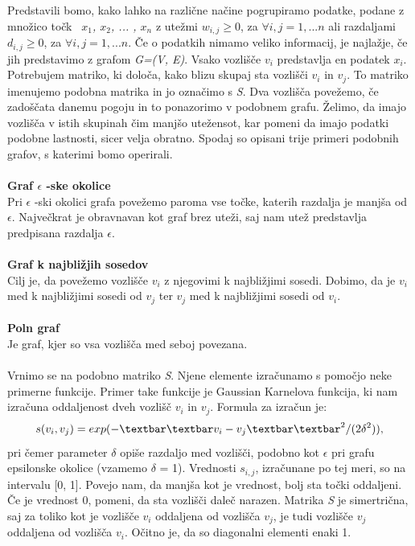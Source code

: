 \documentclass[a4paper, 10pt]{article}
\begin{document}
Predstavili bomo, kako lahko na različne načine pogrupiramo podatke, podane z množico točk \textsl{\ $x_1$, $x_2$, ... , $x_n$ } z utežmi $w_{i,j} \geq 0$, za $\forall i,j = 1, ... n$ ali razdaljami $d_{i,j} \geq 0$, za $\forall i,j = 1, ... n$. Če o podatkih nimamo veliko informacij, je najlažje, če jih predstavimo z grafom \textsl{G=(V, E)}. Vsako vozlišče $v_i$ predstavlja en podatek \textsl{$x_i$}. Potrebujem matriko, ki določa, kako blizu skupaj sta vozlišči $v_i$ in $v_j$. To matriko imenujemo podobna matrika in jo označimo s \textsl{S}. Dva vozlišča povežemo, če zadoščata danemu pogoju in to ponazorimo v podobnem grafu. Želimo, da imajo vozlišča v istih skupinah čim manjšo utežensot, kar pomeni da imajo podatki podobne lastnosti, sicer velja obratno. Spodaj so opisani trije primeri podobnih grafov, s katerimi bomo operirali.\\
\\
\textbf{Graf $\epsilon$ -ske okolice}\\
Pri $\epsilon$ -ski okolici grafa povežemo paroma vse točke, katerih razdalja je manjša od $\epsilon$. Največkrat je obravnavan kot graf brez uteži, saj nam utež predstavlja predpisana razdalja $\epsilon$.\\
\\
\textbf{Graf k najbližjih sosedov}\\
Cilj je, da povežemo vozlišče $v_i$ z njegovimi k najbližjimi sosedi. Dobimo, da je $v_i$ med k najbližjimi sosedi od $v_j$ ter $v_j$ med k najbližjimi sosedi od $v_i$.\\
\\
\textbf{Poln graf}\\
Je graf, kjer so vsa vozlišča med seboj povezana.\\
\\
Vrnimo se na podobno matriko \textsl{S}. Njene elemente izračunamo s pomočjo neke primerne funkcije. Primer take funkcije je Gaussian Karnelova funkcija, ki nam izračuna oddaljenost dveh vozlišč $v_i$ in $v_j$. Formula za izračun je:$$s(v_i, v_j) = exp(-\textbar\textbar v_i - v_j \textbar\textbar^2 / (2\delta^2)),$$pri čemer parameter $\delta$ opiše razdaljo med vozlišči, podobno kot $\epsilon$ pri grafu epsilonske okolice (vzamemo $\delta$ = 1).  Vrednosti $s_{i,j}$, izračunane po tej meri, so na intervalu [0, 1]. Povejo nam, da manjša kot je vrednost, bolj sta točki oddaljeni. Če je vrednost 0, pomeni, da sta vozlišči daleč narazen. Matrika \textsl{S} je simertrična, saj za toliko kot je vozlišče $v_i$ oddaljena od vozlišča $v_j$, je tudi vozlišče $v_j$ oddaljena od vozlišča $v_i$. Očitno je, da so diagonalni elementi enaki 1.\\
\end{document}
